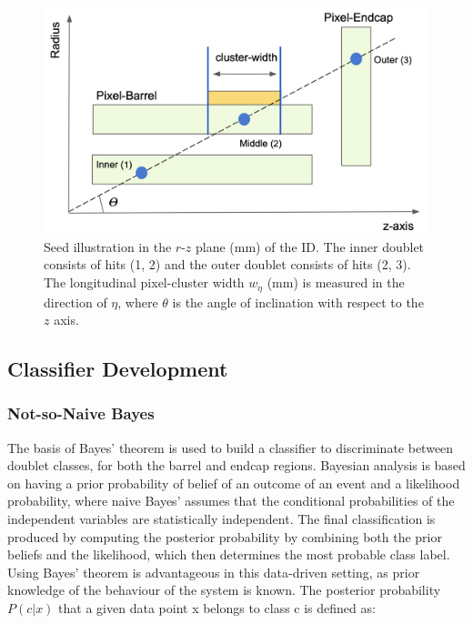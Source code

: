 \begin{figure}[!htbp]
\centering
    \includegraphics[width=0.83\linewidth]{images/4-ml-based-predictor/triplet_illustation.png}
    \caption{Seed illustration in the $r$-$z$ plane (mm) of the ID. The inner doublet consists of hits (1, 2) and the outer doublet consists of hits (2, 3). The longitudinal pixel-cluster width $w_{\eta}$ (mm) is measured in the direction of $\eta$, where $\theta$ is the angle of inclination with respect to the $z$ axis.}
\label{fig:triplet-illustration}
\end{figure}


\subsection{Classifier Development}
\label{section:classifier-dev}

\subsubsection{Not-so-Naive Bayes}

The basis of Bayes’ theorem \cite{naive-bayes} is used to build a classifier to discriminate between doublet classes, for both the barrel and endcap regions. Bayesian analysis is based on having a prior probability of belief of an outcome of an event and a likelihood probability, where naive Bayes’ assumes that the conditional probabilities of the independent variables are statistically independent. The final classification is produced by computing the posterior probability by combining both the prior beliefs and the likelihood, which then determines the most probable class label. Using Bayes’ theorem is advantageous in this data-driven setting, as prior knowledge of the behaviour of the system is known. The posterior probability $P(c|x)$ that a given data point x belongs to class c is defined as:

